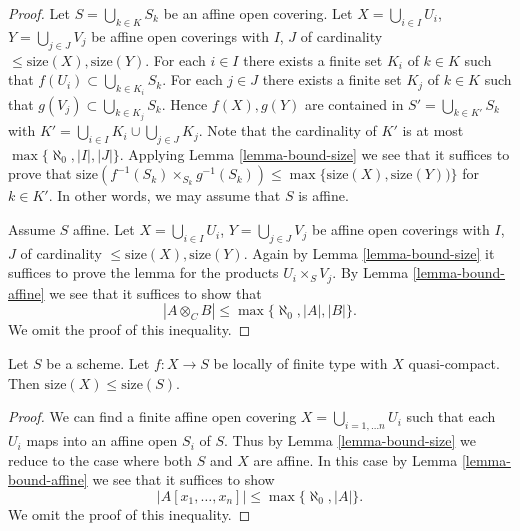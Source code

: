 \begin{proof}
Let $S = \bigcup_{k \in K} S_k$ be an affine open covering.
Let $X = \bigcup_{i \in I} U_i$, $Y = \bigcup_{j \in J} V_j$
be affine open coverings with $I$, $J$ of cardinality
$\leq \text{size}(X), \text{size}(Y)$.
For each $i \in I$ there exists a finite set $K_i$ of $k \in K$
such that $f(U_i) \subset \bigcup_{k \in K_i} S_k$.
For each $j \in J$ there exists a finite set $K_j$ of $k \in K$
such that $g(V_j) \subset \bigcup_{k \in K_j} S_k$.
Hence $f(X), g(Y)$ are contained in
$S' = \bigcup_{k \in K'} S_k$ with
$K' = \bigcup_{i \in I} K_i \cup \bigcup_{j \in J} K_j$.
Note that the cardinality of $K'$
is at most $\max\{\aleph_0, |I|, |J|\}$. Applying
Lemma \ref{lemma-bound-size}
we see that it suffices to prove that
$\text{size}(f^{-1}(S_k) \times_{S_k} g^{-1}(S_k))
\leq \max\{\text{size}(X), \text{size}(Y))\}$ for $k \in K'$.
In other words, we may assume that $S$ is affine.

\medskip\noindent
Assume $S$ affine.
Let $X = \bigcup_{i \in I} U_i$, $Y = \bigcup_{j \in J} V_j$
be affine open coverings with $I$, $J$ of cardinality
$\leq \text{size}(X), \text{size}(Y)$. 
Again by 
Lemma \ref{lemma-bound-size}
it suffices to prove the lemma for the products
$U_i \times_S V_j$. By
Lemma \ref{lemma-bound-affine}
we see that it suffices to show that
$$
|A \otimes_C B| \leq \max\{\aleph_0, |A|, |B|\}.
$$
We omit the proof of this inequality.
\end{proof}

\begin{lemma}
\label{lemma-bound-finite-type}
Let $S$ be a scheme.
Let $f : X \to S$ be locally of finite type with $X$ quasi-compact.
Then $\text{size}(X) \leq \text{size}(S)$.
\end{lemma}

\begin{proof}
We can find a finite affine open covering $X = \bigcup_{i = 1, \ldots n} U_i$
such that each $U_i$ maps into an affine open $S_i$ of $S$. Thus by
Lemma \ref{lemma-bound-size}
we reduce to the case where both $S$ and $X$ are affine. In this case by
Lemma \ref{lemma-bound-affine}
we see that it suffices to show
$$
|A[x_1, \ldots, x_n]| \leq \max\{\aleph_0, |A|\}.
$$
We omit the proof of this inequality.
\end{proof}

